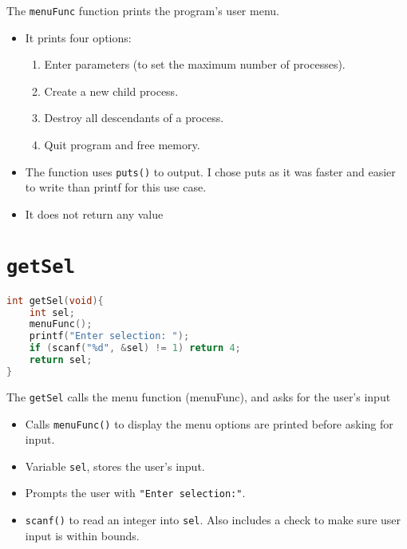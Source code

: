 \documentclass[12pt]{article}
\begin{document}
The \texttt{menuFunc} function prints the program’s user menu. 


\begin{itemize}
  
  \item It prints four options:
  \begin{enumerate}
    \item Enter parameters (to set the maximum number of processes).
    \item Create a new child process.
    \item Destroy all descendants of a process.
    \item Quit program and free memory.
  \end{enumerate}

  \item The function uses \texttt{puts()} to output. I chose puts as it was faster and easier to write than printf for this use case. 
  
  \item It does not return any value\end{itemize}

\section*{\texttt{getSel}}
\begin{lstlisting}[language=C]
int getSel(void){
    int sel;
    menuFunc();
    printf("Enter selection: ");
    if (scanf("%d", &sel) != 1) return 4;
    return sel;
}
\end{lstlisting}

The \texttt{getSel} calls the menu function (menuFunc), and asks for the user's input
\begin{itemize}
  \item Calls \texttt{menuFunc()} to display the menu options are printed before asking for input.
  \item Variable \texttt{sel}, stores the user’s input.
  \item Prompts the user with \texttt{"Enter selection:"}.
  \item \texttt{scanf()} to read an integer into \texttt{sel}. Also includes a check to make sure user input is within bounds.
    \end{itemize}

\newpage
\end{document}
